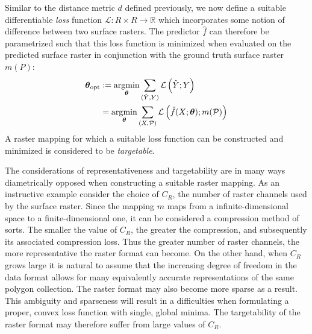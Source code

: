 \begin{description}[style=nextline]
    Similar to the distance metric $d$ defined previously, we now define a suitable differentiable \textit{loss} function $\mathcal{L}: R \times R \rightarrow \mathbb{R}$ which incorporates some notion of difference between two surface rasters.
    The predictor $\hat{f}$ can therefore be parametrized such that this loss function is minimized when evaluated on the predicted surface raster in conjunction with the ground truth surface raster $m(P)$:
    \begin{align*}
      \boldsymbol{\theta}_{\mathrm{opt}}
      &\vcentcolon=
      \operatorname*{\arg\!\min}_{\boldsymbol{\theta}}
      \sum_{(\hat{Y}, Y)}
      \mathcal{L}\left(
        \hat{Y};
        Y
      \right)
      \\
      &=
      \operatorname*{\arg\!\min}_{\boldsymbol{\theta}}
      \sum_{(X, \mathcal{P})}
      \mathcal{L}\left(
        \hat{f}(X; \boldsymbol{\theta});
        m(\mathcal{P})
      \right)
    \end{align*}
    A raster mapping for which a suitable loss function can be constructed and minimized is considered to be \textit{targetable}.
\end{description}
The considerations of representativeness and targetability are in many ways diametrically opposed when constructing a suitable raster mapping.
As an instructive example consider the choice of $C_R$, the number of raster channels used by the surface raster.
Since the mapping $m$ maps from a infinite-dimensional space to a finite-dimensional one, it can be considered a compression method of sorts.
The smaller the value of $C_R$, the greater the compression, and subsequently its associated compression loss.
Thus the greater number of raster channels, the more representative the raster format can become.
On the other hand, when $C_R$ grows large it is natural to assume that the increasing degree of freedom in the data format allows for many equivalently accurate representations of the same polygon collection.
The raster format may also become more sparse as a result.
This ambiguity and sparseness will result in a difficulties when formulating a proper, convex loss function with single, global minima.
The targetability of the raster format may therefore suffer from large values of $C_R$.

